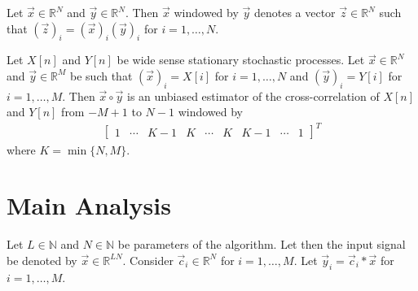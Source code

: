 \documentclass[a4paper, openany, oneside]{memoir}
\begin{document}
\begin{blockDefinition}[Window]
    Let $\vec{x} \in \mathbb{R}^N$ and $\vec{y} \in \mathbb{R}^N$. Then $\vec{x}$ windowed by $\vec{y}$ denotes a vector $\vec{z} \in \mathbb{R}^N$ such that $(\vec{z})_i = (\vec{x})_i (\vec{y})_i$ for $i = 1,\ldots,N$.
\end{blockDefinition}

\begin{blockTheorem} \label{th:corr-unbiased}
    Let $X[n]$ and $Y[n]$ be wide sense stationary stochastic processes. Let $\vec{x} \in \mathbb{R}^N$ and $\vec{y} \in \mathbb{R}^M$ be such that $(\vec{x})_i = X[i]$ for $i=1,\ldots,N$ and $(\vec{y})_i = Y[i]$ for $i=1,\ldots,M$. Then $\vec{x} \circ \vec{y}$ is an unbiased estimator of the cross-correlation of $X[n]$ and $Y[n]$ from $-M+1$ to $N-1$ windowed by
    \begin{align*}
        \begin{bmatrix}
            1 & \cdots & K - 1 & K & \cdots &K & K - 1 & \cdots & 1
        \end{bmatrix}^T
    \end{align*}
    where $K = \min\{N,M\}$.
\end{blockTheorem}

\section{Main Analysis}

Let $L \in \mathbb{N}$ and $N \in \mathbb{N}$ be parameters of the algorithm. Let then the input signal be denoted by $\vec{x} \in \mathbb{R}^{LN}$. Consider $\vec{c}_i \in \mathbb{R}^{N}$ for $i = 1,\ldots,M$. Let $\vec{y}_i = \vec{c}_i \ast \vec{x}$ for $i = 1,\ldots,M$.

\begin{blockTheorem} \label{th:conv-corr}
\end{blockTheorem}
\end{document}
